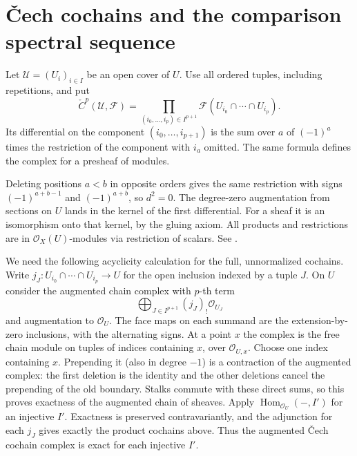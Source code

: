 \section{\v{C}ech cochains and the comparison spectral sequence}

\begin{definition}\label{res:H02}
Let \(\mathcal U=(U_i)_{i\in I}\) be an open cover of \(U\).
Use all ordered tuples, including repetitions, and put
\[
  \check C^p(\mathcal U,\mathcal F)=
    \prod_{(i_0,\ldots,i_p)\in I^{p+1}}
       \mathcal F(U_{i_0}\cap\cdots\cap U_{i_p}).
\]
Its differential on the component \((i_0,\ldots,i_{p+1})\) is
the sum over \(a\) of \((-1)^a\) times the restriction of the
component with \(i_a\) omitted. The same formula defines the
complex for a presheaf of modules.
\end{definition}

Deleting positions \(a<b\) in opposite orders gives the same restriction
with signs \((-1)^{a+b-1}\) and \((-1)^{a+b}\), so \(d^2=0\).
The degree-zero augmentation from sections on \(U\) lands in the
kernel of the first differential. For a sheaf it is an isomorphism
onto that kernel, by the gluing axiom. All products and restrictions
are in \(\mathcal O_X(U)\)-modules via restriction of scalars.
See \cite[Sections 9--11]{stacks-sheaf}.

We need the following acyclicity calculation for the full, unnormalized
cochains. Write \(j_J:U_{i_0}\cap\cdots\cap U_{i_p}\to U\) for the open
inclusion indexed by a tuple \(J\). On \(U\) consider the augmented
chain complex with \(p\)-th term
\[
     \bigoplus_{J\in I^{p+1}}(j_J)_!\mathcal O_{U_J}
\]
and augmentation to \(\mathcal O_U\). The face maps on each summand
are the extension-by-zero inclusions, with the alternating signs.
At a point \(x\) the complex is the free chain module on tuples
of indices containing \(x\), over \(\mathcal O_{U,x}\). Choose one
index containing \(x\). Prepending it (also in degree \(-1\))
is a contraction of the augmented complex: the first deletion is
the identity and the other deletions cancel the prepending of the
old boundary. Stalks commute with these direct sums, so this proves
exactness of the augmented chain of sheaves. Apply
\(\operatorname{Hom}_{\mathcal O_U}(-,I')\) for an injective \(I'\).
Exactness is preserved contravariantly, and the adjunction for each
\(j_J\) gives exactly the product cochains above. Thus the
augmented \v{C}ech cochain complex is exact for each injective \(I'\).

